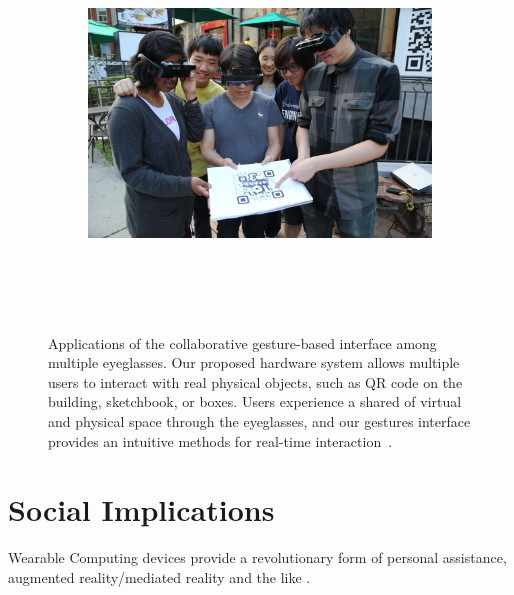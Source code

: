 \begin{figure}
        \begin{subfigure}[b]{\textwidth}
                \centering
\includegraphics[height=4in]{ch5/figs/wearable/low_res/3_eyeglass_paper_2_IMG_2175.jpg} 
                \caption{}
                \label{fig:qr_paper}
        \end{subfigure}
        
        \caption{Applications of the collaborative gesture-based interface among multiple eyeglasses. Our proposed hardware system allows multiple users to interact with real physical objects, such as QR code on the building, sketchbook, or boxes. Users experience a shared of virtual and physical space through the eyeglasses, and our gestures interface provides an intuitive methods for real-time interaction~\cite{billinghurst2008tangible, lo2013augmediated}.}\label{fig:wearable_qr}
\end{figure}

\section{Social Implications}
Wearable Computing devices provide a revolutionary form of personal assistance, augmented reality/mediated reality and the like \cite{hill2004reality,aimone2003eyetap}.

